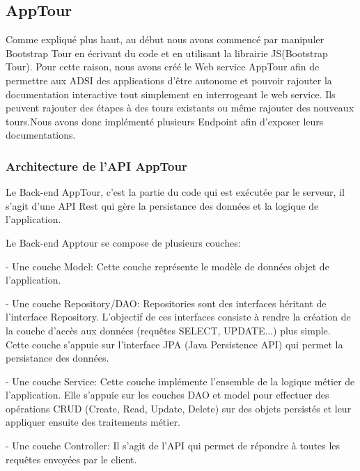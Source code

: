 \documentclass[12pt]{article}
\begin{document}
\subsection{AppTour}   

Comme expliqué plus haut, au début nous avons commencé par manipuler Bootstrap Tour en écrivant du code et en utilisant la librairie JS(Bootstrap Tour). Pour cette raison, nous avons créé le Web service AppTour afin de permettre aux ADSI des applications d'être autonome et pouvoir rajouter la documentation interactive tout simplement en interrogeant le web service. Ils peuvent rajouter des étapes à des tours existants ou même rajouter des nouveaux tours.Nous avons donc implémenté plusieurs Endpoint afin d'exposer leurs documentations.  
 
\subsubsection{Architecture de l'API AppTour}

Le Back-end AppTour, c’est la partie du code qui est exécutée par le serveur, il s'agit d'une API Rest qui gère la persistance des données et la logique de l'application. 
 

Le Back-end Apptour se compose de plusieurs couches: \newline

- Une couche Model: Cette couche représente le modèle de données objet de l'application. \newline

- Une couche Repository/DAO: Repositories sont des interfaces héritant de l'interface Repository. L'objectif de ces interfaces consiste à rendre la création de la couche d'accès aux données (requêtes SELECT, UPDATE...) plus simple. Cette couche s'appuie sur l'interface JPA (Java Persistence API) qui permet la persistance des données.\newline


- Une couche Service: Cette couche implémente l'ensemble de la logique métier de l'application. Elle s'appuie sur les couches DAO et model pour effectuer des opérations CRUD (Create, Read, Update, Delete) sur des objets persistés et leur appliquer ensuite des traitements métier.\newline


- Une couche Controller: Il s'agit de l'API qui permet de répondre à toutes les requêtes envoyées par le client. 
\end{document}
